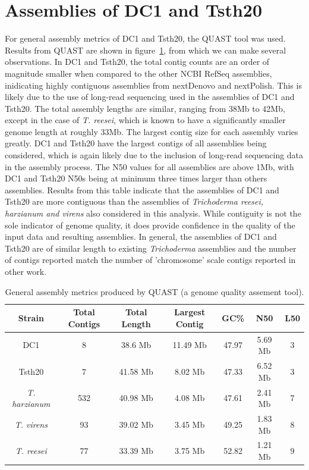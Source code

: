 \section{Assemblies of DC1 and Tsth20}

For general assembly metrics of DC1 and Tsth20, the QUAST tool was
used. Results from QUAST are shown in figure~\ref{table:assemblies},
from which we can make several observations. In DC1 and Tsth20, the
total contig counts are an order of magnitude smaller when compared to
the other NCBI RefSeq assemblies, inidicating highly contiguous
assemblies from nextDenovo and nextPolish. This is likely due to the
use of long-read sequencing used in the assemblies of DC1 and
Tsth20. The total assembly lengths are similar, ranging from 38Mb to
42Mb, except in the case of \textit{T. reesei}, which is known to have
a significantly smaller genome length \cite{Kubicek2019} at roughly
33Mb. The largest contig size for each assembly varies greatly. DC1
and Tsth20 have the largest contigs of all assemblies being
considered, which is again likely due to the inclusion of long-read
sequencing data in the assembly process. The N50 values for all
assemblies are above 1Mb, with DC1 and Tsth20 N50s being at minimum
three times larger than others assemblies. Results from this table
indicate that the assemblies of DC1 and Tsth20 are more contiguous
than the assemblies of \textit{Trichoderma reesei, harzianum and
  virens} also considered in this analysis. While contiguity is not
the sole indicator of genome quality, it does provide confidence in
the quality of the input data and resulting assemblies. In general,
the assemblies of DC1 and Tsth20 are of similar length to existing
\textit{Trichoderma} assemblies and the number of contigs reported
match the number of 'chromosome' scale contigs reported in other work.

\begin{table}
  \begin{center}
    \begin{tabular}{|c|c|c|c|c|c|c|}
      \hline
      Strain & Total Contigs & Total Length & Largest Contig & GC\% & N50 & L50 \\ \hline
      DC1 & 8 & 38.6 Mb & 11.49 Mb & 47.97 & 5.69 Mb & 3 \\ \hline
      Tsth20 & 7 & 41.58 Mb & 8.02 Mb & 47.33 & 6.52 Mb & 3 \\ \hline
      \textit{T. harzianum} & 532 & 40.98 Mb & 4.08 Mb & 47.61 & 2.41 Mb & 7 \\ \hline
      \textit{T. virens} & 93 & 39.02 Mb & 3.45 Mb & 49.25 & 1.83 Mb & 8 \\ \hline
      \textit{T. reesei} & 77 & 33.39 Mb & 3.75 Mb & 52.82 & 1.21 Mb & 9 \\ \hline
    \end{tabular}
  \end{center}
  \caption{General assembly metrics produced by QUAST (a
    genome quality assement tool).}
  \label{table:assemblies}
\end{table}

